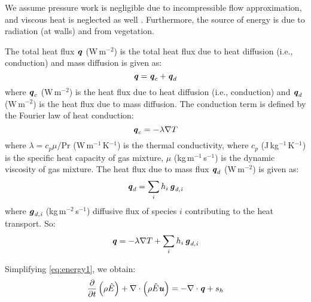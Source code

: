 \begin{assumption}
We assume pressure work is negligible due to incompressible flow approximation, and viscous heat is neglected as well \citep{Defraeye2011}. Furthermore, the source of energy is due to radiation (at walls) and from vegetation. 
\end{assumption}

The total heat flux $\textbf{\textit{q}}$ (W\,m$^{-2}$) is the total heat flux due to heat diffusion (i.e., conduction) and mass diffusion is given as:
\begin{equation}
\textbf{\textit{q}} = \textbf{\textit{q}}_c + \textbf{\textit{q}}_d
\label{eq:totalheatflux}
\end{equation}
where $\textbf{\textit{q}}_c$ (W\,m$^{-2}$) is the heat flux due to heat diffusion (i.e., conduction) and $\textbf{\textit{q}}_d$ (W\,m$^{-2}$) is the heat flux due to mass diffusion. The conduction term is defined by the Fourier law of heat conduction:
\begin{equation}
\textbf{\textit{q}}_c = - \lambda \nabla T
\end{equation}
where $\lambda = c_p\mu/\mathrm{Pr}$ (W\,m$^{-1}$\,K$^{-1}$) is the thermal conductivity, where $c_p$ (J\,kg$^{-1}$\,K$^{-1}$) is the specific heat capacity of gas mixture, $\mu$ (kg\,m$^{-1}$\,s$^{-1}$) is the dynamic viscosity of gas mixture. The heat flux due to mass flux $\textbf{\textit{q}}_d$ (W\,m$^{-2}$) is given as:
\begin{equation}
\textbf{\textit{q}}_d = \sum_i h_i\, \textbf{\textit{g}}_{\textit{d,i}}
\end{equation}
where $\textbf{\textit{g}}_{\textit{d,i}}$ (kg\,m$^{-2}$\,s$^{-1}$) diffusive flux of species $i$ contributing to the heat transport. So:
\begin{equation}
\textbf{\textit{q}} = - \lambda \nabla T + \sum_i h_i\, \textbf{\textit{g}}_{\textit{d,i}}
\end{equation}

Simplifying \cref{eq:energy1}, we obtain:
\begin{equation}
\frac{\partial }{{\partial t}}\left( {{\rho }{\hat{E}}} \right) + \nabla  \cdot \left( {{\rho }{\hat{E}}{\textbf{\textit{u}}}} \right) =  - \nabla  \cdot {\textbf{\textit{q}}}  + s_h
\label{eq:energy1p1}
\end{equation}




